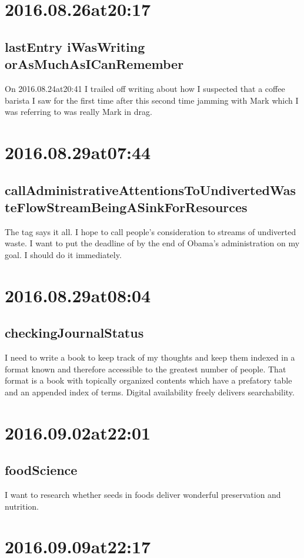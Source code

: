 \begin{enumerate}
\begin{enumerate}
\section*{ 2016.08.26at20:17 }
\subsection*{lastEntry iWasWriting orAsMuchAsICanRemember}
On 2016.08.24at20:41 I trailed off writing about how I suspected that a coffee barista I saw for the first time after this second time jamming with Mark which I was referring to was really Mark in drag.

\section*{ 2016.08.29at07:44 }
\subsection*{callAdministrativeAttentionsToUndivertedWasteFlowStreamBeingASinkForResources}
The tag says it all. I hope to call people's consideration to streams of undiverted waste. I want to put the deadline of by the end of Obama's administration on my goal. I should do it immediately.

\section*{ 2016.08.29at08:04 }
\subsection*{checkingJournalStatus}
I need to write a book to keep track of my thoughts and keep them indexed in a format known and therefore accessible to the greatest number of people. That format is a book with topically organized contents which have a prefatory table and an appended index of terms. Digital availability freely delivers searchability.

\section*{ 2016.09.02at22:01 }
\subsection*{ foodScience }
I want to research whether seeds in foods deliver wonderful preservation and nutrition.

\section*{ 2016.09.09at22:17 }

\end{enumerate}
\end{enumerate}
